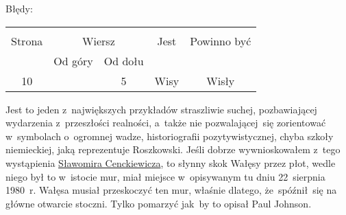 \documentclass[a4paper,11pt]{article}
\begin{document}
\vspace{\spaceTwo}








Błędy:\\
\begin{center}
  \begin{tabular}{|c|c|c|c|c|}
    \hline
    & \multicolumn{2}{c|}{} & & \\
    Strona & \multicolumn{2}{c|}{Wiersz}& Jest & Powinno być \\ \cline{2-3}
    & Od góry & Od dołu &  &  \\ \hline
    10 & & 5 & Wisy & Wisły \\
    \hline
  \end{tabular}
\end{center}

\vspace{\spaceTwo}








\start {} Jest to jeden z~największych przykładów straszliwie
suchej, pozbawiającej wydarzenia z~przeszłości realności, a~także nie
pozwalającej~się zorientować w~symbolach o~ogromnej wadze,
historiografii pozytywistycznej, chyba szkoły niemieckiej, jaką
reprezentuje Roszkowski. Jeśli dobrze wywnioskowałem z~tego
wystąpienia
\href{https://www.youtube.com/watch?v=6B93_3CCMac}{Sławomira
  Cenckiewicza}, to słynny skok Wałęsy przez płot, wedle niego był to
w~istocie mur, miał miejsce w~opisywanym tu dniu 22~sierpnia 1980~r.
Wałęsa musiał przeskoczyć ten mur, właśnie dlatego, że~spóźnił~się na
główne otwarcie stoczni. Tylko pomarzyć jak~by to opisał Paul Johnson.

\vspace{\spaceFour}
\end{document}

